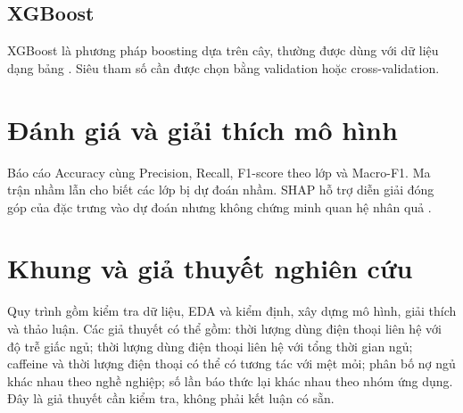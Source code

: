 \subsection{XGBoost}
XGBoost là phương pháp boosting dựa trên cây, thường được dùng với dữ liệu dạng bảng \citep{chen2016xgboost}. Siêu tham số cần được chọn bằng validation hoặc cross-validation.
\section{Đánh giá và giải thích mô hình}
Báo cáo Accuracy cùng Precision, Recall, F1-score theo lớp và Macro-F1. Ma trận nhầm lẫn cho biết các lớp bị dự đoán nhầm. SHAP hỗ trợ diễn giải đóng góp của đặc trưng vào dự đoán nhưng không chứng minh quan hệ nhân quả \citep{lundberg2017shap}.
\section{Khung và giả thuyết nghiên cứu}
Quy trình gồm kiểm tra dữ liệu, EDA và kiểm định, xây dựng mô hình, giải thích và thảo luận. Các giả thuyết có thể gồm: thời lượng dùng điện thoại liên hệ với độ trễ giấc ngủ; thời lượng dùng điện thoại liên hệ với tổng thời gian ngủ; caffeine và thời lượng điện thoại có thể có tương tác với mệt mỏi; phân bố nợ ngủ khác nhau theo nghề nghiệp; số lần báo thức lại khác nhau theo nhóm ứng dụng. Đây là giả thuyết cần kiểm tra, không phải kết luận có sẵn.
